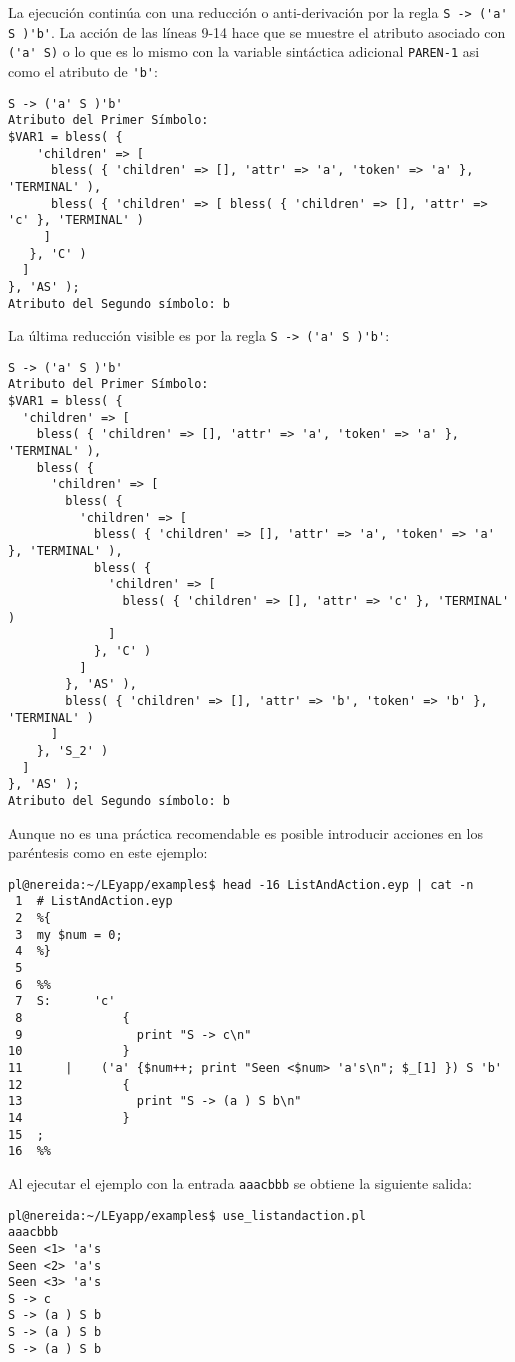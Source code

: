 La ejecución continúa con una  reducción o anti-derivación por la regla 
\verb|S -> ('a' S )'b'|. La acción de las líneas 9-14
hace que se muestre el atributo asociado con \verb|('a' S)|
o lo que es lo mismo con la variable sintáctica adicional
\verb|PAREN-1| asi como el atributo de \verb|'b'|:
\begin{verbatim}
S -> ('a' S )'b'
Atributo del Primer Símbolo:
$VAR1 = bless( {
    'children' => [
      bless( { 'children' => [], 'attr' => 'a', 'token' => 'a' }, 'TERMINAL' ),
      bless( { 'children' => [ bless( { 'children' => [], 'attr' => 'c' }, 'TERMINAL' )
     ]
   }, 'C' )
  ]
}, 'AS' );
Atributo del Segundo símbolo: b
\end{verbatim}
La última reducción visible es por la regla 
\verb|S -> ('a' S )'b'|:
\begin{verbatim}
S -> ('a' S )'b'
Atributo del Primer Símbolo:
$VAR1 = bless( {
  'children' => [
    bless( { 'children' => [], 'attr' => 'a', 'token' => 'a' }, 'TERMINAL' ),
    bless( {
      'children' => [
        bless( {
          'children' => [
            bless( { 'children' => [], 'attr' => 'a', 'token' => 'a' }, 'TERMINAL' ),
            bless( {
              'children' => [
                bless( { 'children' => [], 'attr' => 'c' }, 'TERMINAL' )
              ]
            }, 'C' )
          ]
        }, 'AS' ),
        bless( { 'children' => [], 'attr' => 'b', 'token' => 'b' }, 'TERMINAL' )
      ]
    }, 'S_2' )
  ]
}, 'AS' );
Atributo del Segundo símbolo: b
\end{verbatim}


Aunque no es una práctica recomendable
es posible introducir acciones en los paréntesis
como en este ejemplo:
\begin{verbatim}
pl@nereida:~/LEyapp/examples$ head -16 ListAndAction.eyp | cat -n
 1  # ListAndAction.eyp
 2  %{
 3  my $num = 0;
 4  %}
 5
 6  %%
 7  S:      'c'
 8              {
 9                print "S -> c\n"
10              }
11      |    ('a' {$num++; print "Seen <$num> 'a's\n"; $_[1] }) S 'b'
12              {
13                print "S -> (a ) S b\n"
14              }
15  ;
16  %%
\end{verbatim}

Al ejecutar el ejemplo con la entrada \verb|aaacbbb|
se obtiene la siguiente salida:

\begin{verbatim}
pl@nereida:~/LEyapp/examples$ use_listandaction.pl
aaacbbb
Seen <1> 'a's
Seen <2> 'a's
Seen <3> 'a's
S -> c
S -> (a ) S b
S -> (a ) S b
S -> (a ) S b
\end{verbatim}

